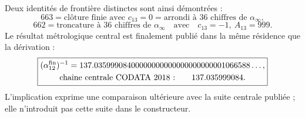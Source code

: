 Deux identités de frontière distinctes sont ainsi démontrées :
\[
 \boxed{
 663=\text{clôture finie avec }c_{13}=0
     =\text{arrondi à 36 chiffres de }\alpha_\infty,}
\]
\[
 \boxed{
 662=\text{troncature à 36 chiffres de }\alpha_\infty
 \quad\text{avec}\quad c_{13}=-1,\ A_{13}=999.}
\]
Le résultat métrologique central est finalement publié dans la même
résidence que la dérivation :
\begin{equation}
 \boxed{
 \begin{gathered}
  (\alpha_{12}^{\rm fin})^{-1}
  =137.03599908400000000000000000000001066588\ldots,\\
  \text{chaîne centrale CODATA 2018 :}\qquad137.035999084.
 \end{gathered}}
 \label{p3-83-c25-s5:eq:resultado-final-alpha-codata-2018}
\end{equation}
L’implication exprime une comparaison ultérieure avec la suite centrale
publiée ; elle n’introduit pas cette suite dans le constructeur.
